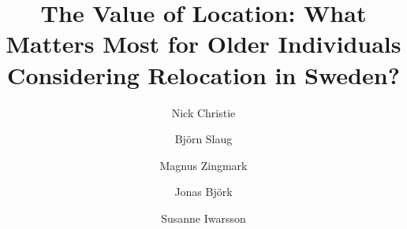 \documentclass[3p,11pt ]{elsarticle}
\begin{document}
\begin{frontmatter}



\title{The Value of Location: What Matters Most for Older Individuals Considering Relocation in Sweden?}


\author[1]{Nick Christie}

\author[1]{Bj\"orn Slaug}

\author[1]{Magnus Zingmark}

\author[2]{Jonas Bj\"ork}


\author[1]{Susanne Iwarsson}

























\end{frontmatter}
\end{document}
